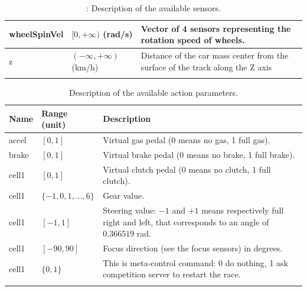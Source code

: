 \documentclass[declaration,shortabstract,english,inz]{iithesis}
\begin{document}
\begin{center}
\begin{longtable}{ | p{} |p{}| p{} |}
     \hline
     wheelSpinVel & $[0, +\infty)$ (rad/s) & Vector of 4 sensors representing the rotation speed of wheels. \\
     \hline
     z & $( -\infty, +\infty ) $ (km/h) & Distance of the car mass center from the surface of the track
     along the Z axis \\
     \hline
     \caption{\label{tab:torcs_sensors}: Description of the available sensors.}
    \end{longtable}

\end{center}

\begin{center}
    \begin{longtable}{ | p{} |p{}| p{} |}
    \hline
    \textbf{Name} & \textbf{Range (unit)} & \textbf{Description}  \\ 
    \hline
    accel & $[0,1]$ & Virtual gas pedal (0 means no gas, 1 full gas). \\ 
     \hline
     brake &  $[0,1]$ & Virtual brake pedal (0 means no brake, 1 full brake). \\ 
     \hline
     cell1 &  $[0,1]$ & Virtual clutch pedal (0 means no clutch, 1 full clutch). \\ 
     \hline
     cell1 & $\{-1,0,1,\dots ,6\}$ & Gear value. \\ 
     \hline
     cell1 &  $[-1,1]$ & Steering value: $-1$ and $+1$ means respectively full right and
     left, that corresponds to an angle of $0.366519$ rad. \\ 
     \hline
     cell1 &  $[-90,90]$ & Focus direction (see the focus sensors) in degrees. \\ 
     \hline
     cell1 &  $\{0,1\}$ & This is meta-control command: 0 do nothing, 1 ask competition
     server to restart the race. \\ 
     \hline
     \caption{\label{tab:torcs_actions}Description of the available  action parameters.}
    \end{longtable}
\end{center}
\end{document}
